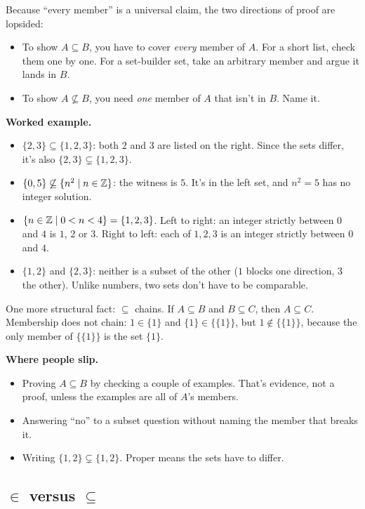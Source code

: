 Because ``every member'' is a universal claim, the two directions of proof are lopsided:
\begin{itemize}
  \item To show $A\subseteq B$, you have to cover \emph{every} member of $A$. For a short list, check them one by one. For a set-builder set, take an arbitrary member and argue it lands in $B$.
  \item To show $A\not\subseteq B$, you need \emph{one} member of $A$ that isn't in $B$. Name it.
\end{itemize}

\textbf{Worked example.}
\begin{itemize}
  \item $\{2,3\}\subseteq\{1,2,3\}$: both $2$ and $3$ are listed on the right. Since the sets differ, it's also $\{2,3\}\subsetneq\{1,2,3\}$.
  \item $\{0,5\}\not\subseteq\{n^2\mathrel{|} n\in\mathbb{Z}\}$: the witness is $5$. It's in the left set, and $n^2=5$ has no integer solution.
  \item $\{n\in\mathbb{Z}\mathrel{|} 0<n<4\}=\{1,2,3\}$. Left to right: an integer strictly between $0$ and $4$ is $1$, $2$ or $3$. Right to left: each of $1,2,3$ is an integer strictly between $0$ and $4$.
  \item $\{1,2\}$ and $\{2,3\}$: neither is a subset of the other ($1$ blocks one direction, $3$ the other). Unlike numbers, two sets don't have to be comparable.
\end{itemize}

One more structural fact: $\subseteq$ chains. If $A\subseteq B$ and $B\subseteq C$, then $A\subseteq C$. Membership does not chain: $1\in\{1\}$ and $\{1\}\in\{\{1\}\}$, but $1\notin\{\{1\}\}$, because the only member of $\{\{1\}\}$ is the set $\{1\}$.

\textbf{Where people slip.}
\begin{itemize}
  \item Proving $A\subseteq B$ by checking a couple of examples. That's evidence, not a proof, unless the examples are all of $A$'s members.
  \item Answering ``no'' to a subset question without naming the member that breaks it.
  \item Writing $\{1,2\}\subsetneq\{1,2\}$. Proper means the sets have to differ.
\end{itemize}

\subsection{\texorpdfstring{$\in$ versus $\subseteq$}{Member versus subset}}\label{sets:ein}

